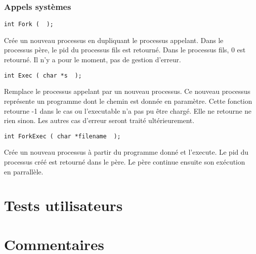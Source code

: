 \documentclass{report}
\begin{document}
\subsection{Appels systèmes}

\begin{verbatim}
int Fork (  );
\end{verbatim}
Crée un nouveau processus en dupliquant le processus appelant. Dans le processus père, le pid du processus fils est retourné. Dans le processus fils, 0 est retourné. 
Il n'y a pour le moment, pas de gestion d'erreur.

\begin{verbatim}
int Exec ( char *s  );
\end{verbatim}
Remplace le processus appelant par un nouveau processus. Ce nouveau processus représente un programme dont le chemin est donnée en paramètre.
Cette fonction retourne -1 dans le cas ou l'executable n'a pas pu être chargé. Elle ne retourne ne rien sinon. Les autres cas d'erreur seront traité ultérieurement. 

\begin{verbatim}
int ForkExec ( char *filename  );
\end{verbatim}
Crée un nouveau processus à partir du programme donné et l'execute. Le pid du processus créé est retourné dans le père.
Le père continue ensuite son exécution en parrallèle.



\chapter{Tests utilisateurs}
\chapter{Commentaires}
\end{document}
